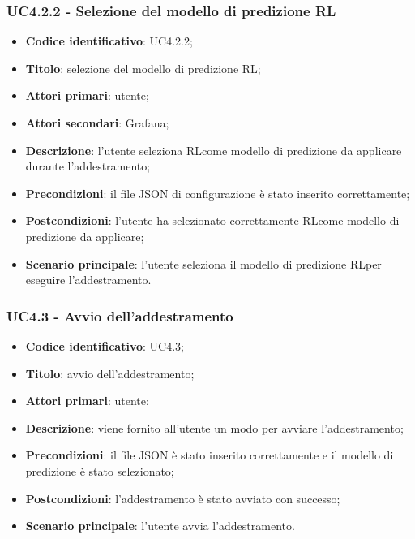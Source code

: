 \subsubsection{UC4.2.2 - Selezione del modello di predizione RL}
\begin{itemize}
	\item \textbf{Codice identificativo}: UC4.2.2;
	\item \textbf{Titolo}: selezione del modello di predizione RL\glo;
	\item \textbf{Attori primari}: utente;
	\item \textbf{Attori secondari}: Grafana\glo;
	\item \textbf{Descrizione}: l'utente seleziona RL\glosp come modello di predizione da applicare durante l'addestramento;
	\item \textbf{Precondizioni}: il file JSON di configurazione è stato inserito correttamente;
	\item \textbf{Postcondizioni}: l'utente ha selezionato correttamente RL\glosp come modello di predizione da applicare;
	\item \textbf{Scenario principale}: l'utente seleziona il modello di predizione RL\glosp per eseguire l'addestramento.
\end{itemize}

\subsubsection{UC4.3 - Avvio dell'addestramento}
\begin{itemize}
    \item \textbf{Codice identificativo}: UC4.3;
    \item \textbf{Titolo}: avvio dell'addestramento;
    \item \textbf{Attori primari}: utente;
    \item \textbf{Descrizione}: viene fornito all'utente un modo per avviare l'addestramento;
    \item \textbf{Precondizioni}: il file JSON è stato inserito correttamente e il modello di predizione è stato selezionato;
    \item \textbf{Postcondizioni}: l'addestramento è stato avviato con successo;
    \item \textbf{Scenario principale}: l'utente avvia l'addestramento.
\end{itemize}

